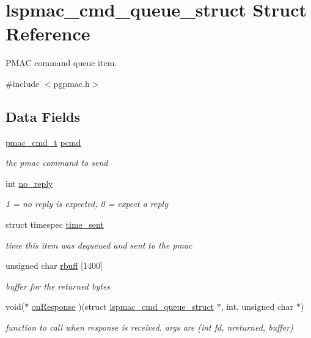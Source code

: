 \hypertarget{structlspmac__cmd__queue__struct}{
\section{lspmac\_\-cmd\_\-queue\_\-struct Struct Reference}
\label{structlspmac__cmd__queue__struct}
}


PMAC command queue item.  


{\ttfamily \#include $<$pgpmac.h$>$}\subsection*{Data Fields}
\begin{DoxyCompactItemize}
\item 
\hyperlink{structtagEthernetCmd}{pmac\_\-cmd\_\-t} \hyperlink{structlspmac__cmd__queue__struct_a9ac7618bbe0faa3001e8efeb1d89010d}{pcmd}
\begin{DoxyCompactList}\small\item\em the pmac command to send \item\end{DoxyCompactList}\item 
int \hyperlink{structlspmac__cmd__queue__struct_a33f70b45f8b7c27935cd3efe28748479}{no\_\-reply}
\begin{DoxyCompactList}\small\item\em 1 = no reply is expected, 0 = expect a reply \item\end{DoxyCompactList}\item 
struct timespec \hyperlink{structlspmac__cmd__queue__struct_a276ebc4b35c2554e4cb7377b60fd89b7}{time\_\-sent}
\begin{DoxyCompactList}\small\item\em time this item was dequeued and sent to the pmac \item\end{DoxyCompactList}\item 
unsigned char \hyperlink{structlspmac__cmd__queue__struct_aa059563886db174f9bb4f7a14bc19bbe}{rbuff} \mbox{[}1400\mbox{]}
\begin{DoxyCompactList}\small\item\em buffer for the returned bytes \item\end{DoxyCompactList}\item 
void($\ast$ \hyperlink{structlspmac__cmd__queue__struct_afe92c0bab9f124314a6f3d8104c94364}{onResponse} )(struct \hyperlink{structlspmac__cmd__queue__struct}{lspmac\_\-cmd\_\-queue\_\-struct} $\ast$, int, unsigned char $\ast$)
\begin{DoxyCompactList}\small\item\em function to call when response is received. args are (int fd, nreturned, buffer) \item\end{DoxyCompactList}\end{DoxyCompactItemize}


